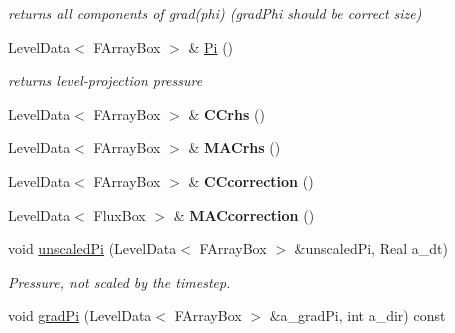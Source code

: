 \begin{DoxyCompactItemize}
\begin{DoxyCompactList}\small\item\em returns all components of grad(phi) (grad\-Phi should be correct size) \end{DoxyCompactList}\item 
\hypertarget{class_c_c_projector_aa91243e2c9e3b6a65b64d454180fc27f}{Level\-Data$<$ F\-Array\-Box $>$ \& \hyperlink{class_c_c_projector_aa91243e2c9e3b6a65b64d454180fc27f}{Pi} ()}\label{class_c_c_projector_aa91243e2c9e3b6a65b64d454180fc27f}

\begin{DoxyCompactList}\small\item\em returns level-\/projection pressure \end{DoxyCompactList}\item 
\hypertarget{class_c_c_projector_a6b761d0314a4fe5c288a814ca78cbf47}{Level\-Data$<$ F\-Array\-Box $>$ \& {\bfseries C\-Crhs} ()}\label{class_c_c_projector_a6b761d0314a4fe5c288a814ca78cbf47}

\item 
\hypertarget{class_c_c_projector_a6ab765a1b76f21987d2a93a18e915038}{Level\-Data$<$ F\-Array\-Box $>$ \& {\bfseries M\-A\-Crhs} ()}\label{class_c_c_projector_a6ab765a1b76f21987d2a93a18e915038}

\item 
\hypertarget{class_c_c_projector_a30274bb19cd174ec3ceba3773dfce422}{Level\-Data$<$ F\-Array\-Box $>$ \& {\bfseries C\-Ccorrection} ()}\label{class_c_c_projector_a30274bb19cd174ec3ceba3773dfce422}

\item 
\hypertarget{class_c_c_projector_a629d1aa1a2f57ce49ca42864b34fce54}{Level\-Data$<$ Flux\-Box $>$ \& {\bfseries M\-A\-Ccorrection} ()}\label{class_c_c_projector_a629d1aa1a2f57ce49ca42864b34fce54}

\item 
\hypertarget{class_c_c_projector_a964f5dc421d4110c56ece31da12bfcc2}{void \hyperlink{class_c_c_projector_a964f5dc421d4110c56ece31da12bfcc2}{unscaled\-Pi} (Level\-Data$<$ F\-Array\-Box $>$ \&unscaled\-Pi, Real a\-\_\-dt)}\label{class_c_c_projector_a964f5dc421d4110c56ece31da12bfcc2}

\begin{DoxyCompactList}\small\item\em Pressure, not scaled by the timestep. \end{DoxyCompactList}\item 
\hypertarget{class_c_c_projector_a4bf99e3ff4784892e3a363fa36c983fc}{void \hyperlink{class_c_c_projector_a4bf99e3ff4784892e3a363fa36c983fc}{grad\-Pi} (Level\-Data$<$ F\-Array\-Box $>$ \&a\-\_\-grad\-Pi, int a\-\_\-dir) const }\label{class_c_c_projector_a4bf99e3ff4784892e3a363fa36c983fc}


\end{DoxyCompactItemize}
